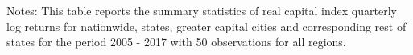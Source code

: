 \begin{table}[!ht]
{\begin{threeparttable}
\begin{tabular}{llHccHccHcc}
  
  
    \bottomrule
    \end{tabular}%
 
\begin{tablenotes}
  \LARGE
      Notes: This table reports the summary statistics of real capital index quarterly log returns for nationwide, states, greater capital cities and corresponding rest of states for the period 2005 - 2017 with 50 observations for all regions.
\end{tablenotes}    

     
  \end{threeparttable} 
 
 
  }
  
  
  
\end{table}%
